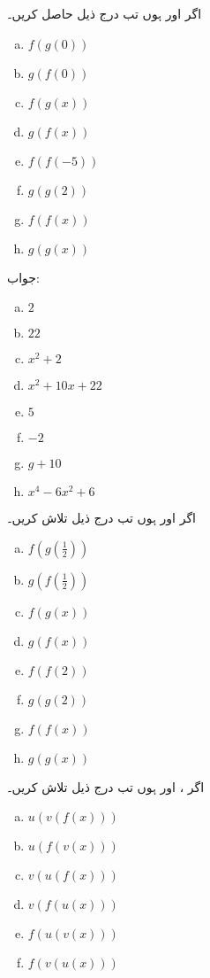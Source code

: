 اگر  اور  ہوں تب درج ذیل حاصل کریں۔
\begin{multicols}{4}
\begin{enumerate}[a.]
\item
$f(g(0))$
\item
$g(f(0))$
\item
$f(g(x))$
\item
$g(f(x))$
\item
$f(f(-5))$
\item
$g(g(2))$
\item
$f(f(x))$
\item
$g(g(x))$
\end{enumerate}
\end{multicols}
جواب:
\begin{multicols}{4}
\begin{enumerate}[a.]
\item
$2$
\item
$22$
\item
$x^2+2$
\item
$x^2+10x+22$
\item
$5$
\item
$-2$
\item
$g+10$
\item
$x^4-6x^2+6$
\end{enumerate}
\end{multicols}
اگر  اور  ہوں تب درج ذیل تلاش کریں۔
\begin{multicols}{4}
\begin{enumerate}[a.]
\item
$f(g(\tfrac{1}{2}))$
\item
$g(f(\tfrac{1}{2}))$
\item
$f(g(x))$
\item
$g(f(x))$
\item
$f(f(2))$
\item
$g(g(2))$
\item
$f(f(x))$
\item
$g(g(x))$
\end{enumerate}
\end{multicols}
اگر ،  اور  ہوں تب درج ذیل تلاش کریں۔
\begin{multicols}{4}
\begin{enumerate}[a.]
\item
$u(v(f(x)))$
\item
$u(f(v(x)))$
\item
$v(u(f(x)))$
\item
$v(f(u(x)))$
\item
$f(u(v(x)))$
\item
$f(v(u(x)))$
\end{enumerate}
\end{multicols}
